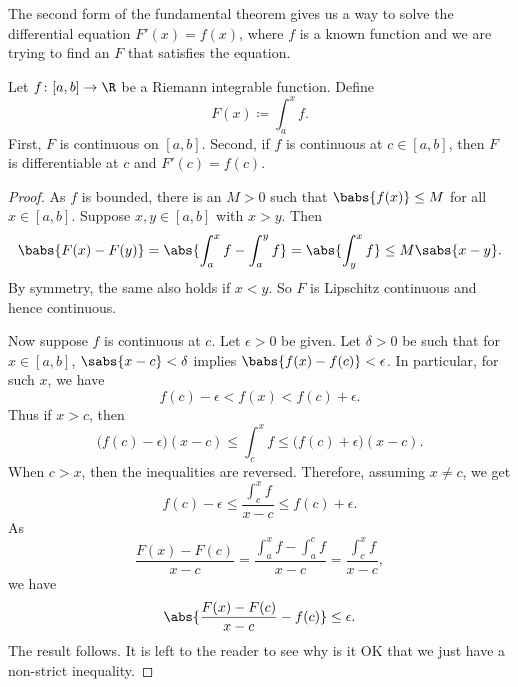 The second form of the fundamental theorem gives us a way to solve
the differential equation $F'(x) = f(x)$, where $f$ is a known
function and we are trying to find an $F$ that satisfies the equation.

\begin{thm} \label{thm:FTCv2}
Let $f \colon [a,b] \to \R$ be a Riemann integrable function.  Define
\begin{equation*}
F(x) \coloneqq \int_a^x f .
\end{equation*}
First, $F$ is continuous on $[a,b]$.  Second,
if $f$ is continuous at $c \in [a,b]$, then $F$ is differentiable at $c$
and $F'(c) = f(c)$.
\end{thm}

\begin{proof}
As $f$ is bounded, there is an $M > 0$
such that $\babs{f(x)} \leq M$ for all $x \in [a,b]$.  Suppose $x,y \in [a,b]$
with $x > y$.  Then
\begin{equation*}
\babs{F(x)-F(y)} =
\abs{\int_a^x f - \int_a^y f}
=
\abs{\int_y^x f}
\leq
M\sabs{x-y} .
\end{equation*}
By symmetry, the same also holds if $x < y$.
So $F$ is Lipschitz continuous and hence continuous.

Now suppose $f$ is continuous at $c$.
Let $\epsilon > 0$ be given.  Let $\delta > 0$ be such that
for $x \in [a,b]$,
$\sabs{x-c} < \delta$ implies $\babs{f(x)-f(c)} < \epsilon$.
In particular,
for such $x$, we have
\begin{equation*}
f(c)-\epsilon < f(x) < f(c) + \epsilon.
\end{equation*}
Thus if $x > c$, then
\begin{equation*}
\bigl(f(c)-\epsilon\bigr) (x-c) \leq \int_c^x f \leq
\bigl(f(c) + \epsilon\bigr)(x-c).
\end{equation*}
When $c > x$, then the inequalities are reversed.  Therefore,
assuming $x \neq c$, we get
\begin{equation*}
f(c)-\epsilon
\leq
\frac{\int_c^{x} f}{x-c}
\leq
f(c)+\epsilon .
\end{equation*}
As 
\begin{equation*}
\frac{F(x)-F(c)}{x-c}
=
\frac{\int_a^{x} f - \int_a^{c} f}{x-c}
=
\frac{\int_c^{x} f}{x-c} ,
\end{equation*}
we have 
\begin{equation*}
\abs{\frac{F(x)-F(c)}{x-c} - f(c)} \leq \epsilon .
\end{equation*}
The result follows.  It is left to the reader to see why is it OK that we
just have a non-strict inequality.
\end{proof}

